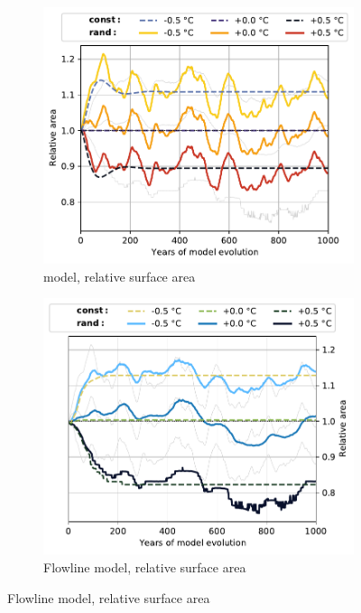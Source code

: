 \begin{figure}[p]
  \begin{subfigure}[b]{0.476\textwidth}
    \caption{\Vas{} model, relative surface area}
    \label{fig:Rhonegletscher:area_vas}
    \centering
    \includegraphics[width=\textwidth]{../plots/final_plots/time_series/single_glaciers/area_norm_vas_Rhonegletscher.pdf}
  \end{subfigure}
  \hfill
  \begin{subfigure}[b]{0.476\textwidth}
    \caption{Flowline model, relative surface area}
    \label{fig:Rhonegletscher:area_fl}
    \centering
    \includegraphics[width=\textwidth]{../plots/final_plots/time_series/single_glaciers/area_norm_fl_Rhonegletscher.pdf}
  \end{subfigure}


\end{figure}
